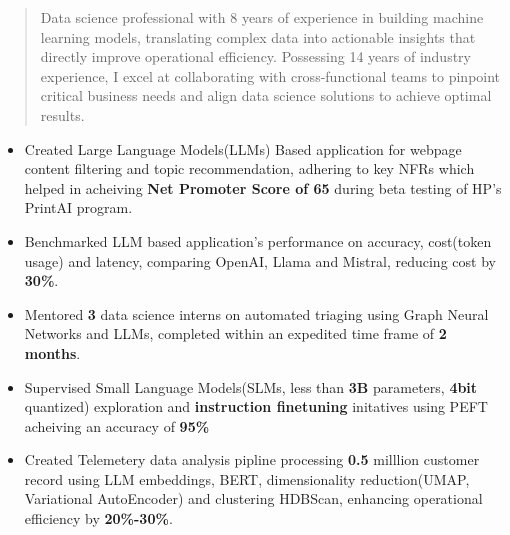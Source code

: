 \documentclass[10pt,a4paper,ragged2e,withhyper]{altacv}
\author{Gaurav Sood}
\date{\today}
\title{}
\begin{document}

\makecvheader

\begin{paracol}{1}
 \begin{quote}
Data science professional with 8 years of experience in building machine learning models, translating complex data into actionable insights that directly improve operational efficiency. Possessing 14 years of industry experience, I excel at collaborating with cross-functional teams to pinpoint critical business needs and align data science solutions to achieve optimal results.
 \end{quote}
\label{sec:org12fe53a}
\divider



\divider



\label{sec:orge372265}

\begin{itemize}
\item Created Large Language Models(LLMs) Based application for webpage content
filtering and topic recommendation, adhering to key NFRs which helped in
acheiving \textbf{\textbf{Net Promoter Score of 65}} during beta testing of HP's PrintAI
program.
\item Benchmarked LLM based application's performance on accuracy, cost(token usage)
and latency, comparing OpenAI, Llama and Mistral, reducing cost by \textbf{\textbf{30\%}}.
\item Mentored \textbf{\textbf{3}} data science interns on automated triaging using Graph Neural
Networks and LLMs, completed within an expedited time frame of \textbf{\textbf{2 months}}.
\item Supervised Small Language Models(SLMs, less than \textbf{\textbf{3B}} parameters, \textbf{\textbf{4bit}}
quantized) exploration and \textbf{\textbf{instruction finetuning}}
initatives using PEFT acheiving an accuracy of \textbf{\textbf{95\%}}
\item Created Telemetery data analysis pipline processing \textbf{\textbf{0.5}} milllion customer
record using LLM embeddings, BERT, dimensionality reduction(UMAP, Variational
AutoEncoder) and clustering HDBScan, enhancing operational efficiency by \textbf{\textbf{20\%-30\%}}.
\end{itemize}


\end{paracol}
\end{document}
